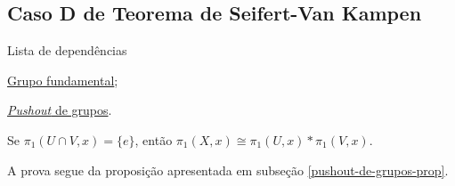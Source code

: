 \subsection{Caso D de Teorema de Seifert-Van Kampen} %
\label{teorema-s-vk-caso-d-prop}
\begin{titlemize}{Lista de dependências}
	\item \hyperref[grupo-fundamental]{Grupo fundamental};\\
    \item \hyperref[pushout-de-grupos-prop]{\emph{Pushout} de grupos}.\\
\end{titlemize}
\begin{prop}
    Se $\pi_1(U\cap V,x)=\{e\}$, então $\pi_1(X,x)\cong\pi_1(U,x)*\pi_1(V,x).$
\end{prop}
\begin{dem}
    A prova segue da proposição apresentada em subseção \ref{pushout-de-grupos-prop}.
\end{dem}

